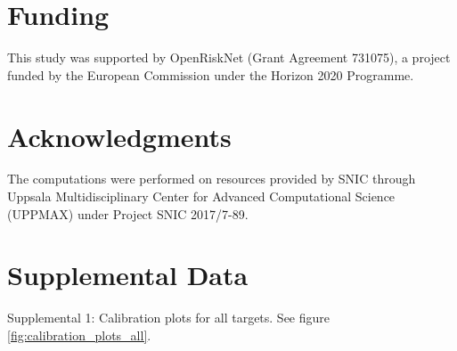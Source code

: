 \documentclass[utf8]{frontiersSCNS} %
\begin{document}
\section*{Funding}
This study was supported by OpenRiskNet (Grant Agreement 731075), a project
funded by the European Commission under the Horizon 2020 Programme.

\section*{Acknowledgments}
The computations were performed on resources provided by SNIC through Uppsala
Multidisciplinary Center for Advanced Computational Science (UPPMAX) under
Project SNIC 2017/7-89.



\newpage
\appendix
\section*{Supplemental Data}
%
%

Supplemental 1: Calibration plots for all targets. See figure
\ref{fig:calibration_plots_all}.
\end{document}
